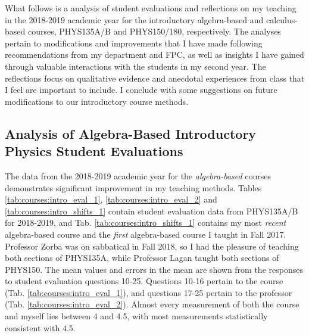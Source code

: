 \documentclass[../../main.tex]{subfiles}
\begin{document}
\label{sec:oof}

What follows is a analysis of student evaluations and reflections on my teaching in the 2018-2019 academic year for the introductory algebra-based and calculus-based courses, PHYS135A/B and PHYS150/180, respectively.  The analyses pertain to modifications and improvements that I have made following recommendations from my department and FPC, as well as insights I have gained through valuable interactions with the students in my second year.  The reflections focus on qualitative evidence and anecdotal experiences from class that I feel are important to include.  I conclude with some suggestions on future modifications to our introductory course methods.  \\ \hspace{0.1cm}

\subsection{Analysis of Algebra-Based Introductory Physics Student Evaluations}

The data from the 2018-2019 academic year for the \textit{algebra-based} courses demonstrates significant improvement in my teaching methods.  Tables \ref{tab:courses:intro_eval_1}, \ref{tab:courses:intro_eval_2} and \ref{tab:courses:intro_shifts_1} contain student evaluation data from PHYS135A/B for 2018-2019, and Tab. \ref{tab:courses:intro_shifts_1} contains my most \textit{recent} algebra-based course and the \textit{first} algebra-based course I taught in Fall 2017.  Professor Zorba was on sabbatical in Fall 2018, so I had the pleasure of teaching both sections of PHYS135A, while Professor Lagan taught both sections of PHYS150.  The mean values and errors in the mean are shown from the responses to student evaluation questions 10-25.  Questions 10-16 pertain to the course (Tab. \ref{tab:courses:intro_eval_1}), and questions 17-25 pertain to the professor (Tab. \ref{tab:courses:intro_eval_2}).  Almost every measurement of both the course and myself lies between 4 and 4.5, with most measurements statistically consistent with 4.5. \\ \hspace{0.1cm}
\end{document}
